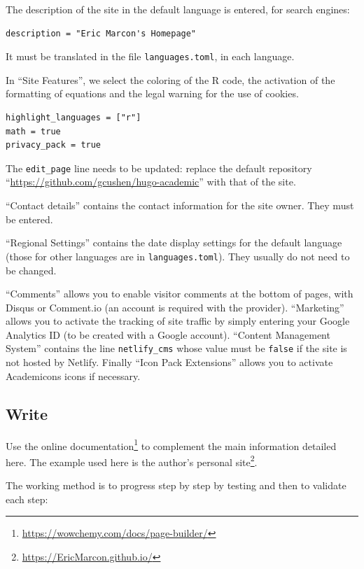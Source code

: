 \documentclass[
  12pt,
  american,
  a4paper,
  extrafontsizes,onecolumn,openright
  ]{memoir}
\begin{document}
The description of the site in the default language is entered, for search engines:

\begin{verbatim}
description = "Eric Marcon's Homepage"
\end{verbatim}

It must be translated in the file \texttt{languages.toml}, in each language.

In \enquote{Site Features}, we select the coloring of the R code, the activation of the formatting of equations and the legal warning for the use of cookies.

\begin{verbatim}
highlight_languages = ["r"] 
math = true
privacy_pack = true
\end{verbatim}

The \texttt{edit\_page} line needs to be updated: replace the default repository \enquote{\url{https://github.com/gcushen/hugo-academic}} with that of the site.

\enquote{Contact details} contains the contact information for the site owner.
They must be entered.

\enquote{Regional Settings} contains the date display settings for the default language (those for other languages are in \texttt{languages.toml}).
They usually do not need to be changed.

\enquote{Comments} allows you to enable visitor comments at the bottom of pages, with Disqus or Comment.io (an account is required with the provider).
\enquote{Marketing} allows you to activate the tracking of site traffic by simply entering your Google Analytics ID (to be created with a Google account).
\enquote{Content Management System} contains the line \texttt{netlify\_cms} whose value must be \texttt{false} if the site is not hosted by Netlify.
Finally \enquote{Icon Pack Extensions} allows you to activate Academicons icons if necessary.

\subsection{Write}\label{write-2}

Use the online documentation\footnote{\url{https://wowchemy.com/docs/page-builder/}} to complement the main information detailed here.
The example used here is the author's personal site\footnote{\url{https://EricMarcon.github.io/}}.

The working method is to progress step by step by testing and then to validate each step:
\end{document}
